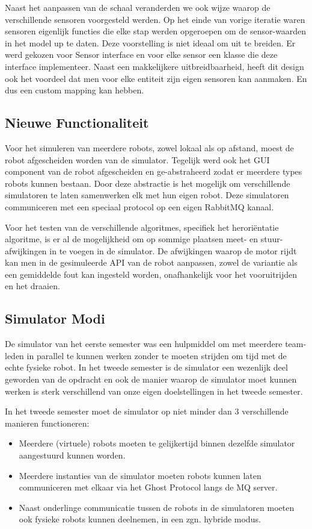 \documentclass[12pt,a4paper]{report}
\begin{document}
Naast het aanpassen van de schaal veranderden we ook wijze waarop de verschillende sensoren voorgesteld werden. Op het einde van vorige iteratie waren sensoren eigenlijk functies die elke stap werden opgeroepen om de sensor-waarden in het model up te daten. Deze voorstelling is niet ideaal om uit te breiden. Er werd gekozen voor Sensor interface en voor elke sensor een klasse die deze interface implementeer. Naast een makkelijkere uitbreidbaarheid, heeft dit design ook het voordeel dat men voor elke entiteit zijn eigen sensoren kan aanmaken. En dus een custom mapping kan hebben.

\subsection{Nieuwe Functionaliteit}

Voor het simuleren van meerdere robots, zowel lokaal als op afstand, moest de robot afgescheiden worden van de simulator. Tegelijk werd ook het GUI component van de robot afgescheiden en ge-abstraheerd zodat er meerdere types robots kunnen bestaan. Door deze abstractie is het mogelijk om verschillende simulatoren te laten samenwerken elk met hun eigen robot. Deze simulatoren communiceren met een speciaal protocol op een eigen RabbitMQ kanaal.

Voor het testen van de verschillende algoritmes, specifiek het herori\"entatie algoritme, is er al de mogelijkheid om op sommige plaatsen meet- en stuur-afwijkingen in te voegen in de simulator. De afwijkingen waarop de motor rijdt kan men in de gesimuleerde API van de robot aanpassen, zowel de variantie als een gemiddelde fout kan ingesteld worden, onafhankelijk voor het vooruitrijden en het draaien.

\subsection{Simulator Modi}

De simulator van het eerste semester was een hulpmiddel om met meerdere team-leden in parallel te kunnen werken zonder te moeten strijden om tijd met de echte fysieke robot. In het tweede semester is de simulator een wezenlijk deel geworden van de opdracht en ook de manier waarop de simulator moet kunnen werken is sterk verschillend van onze eigen doelstellingen in het tweede semester.

In het tweede semester moet de simulator op niet minder dan 3 verschillende manieren functioneren:

\begin{itemize}
\item Meerdere (virtuele) robots moeten te gelijkertijd binnen dezelfde simulator aangestuurd kunnen worden.
\item Meerdere instanties van de simulator moeten robots kunnen laten communiceren met elkaar via het Ghost Protocol langs de MQ server.
\item Naast onderlinge communicatie tussen de robots in de simulatoren moeten ook fysieke robots kunnen deelnemen, in een zgn. hybride modus.
\end{itemize}
\end{document}
